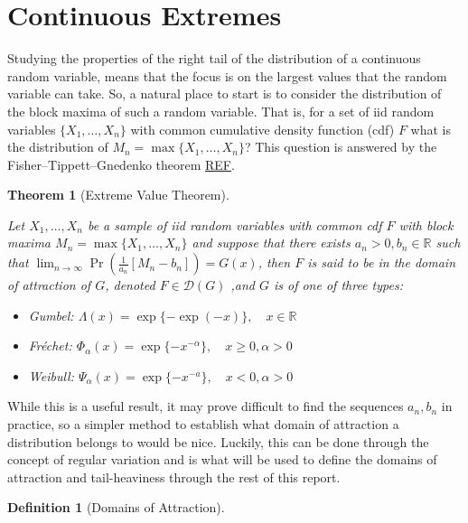 \documentclass[
  10pt,
  a4paper,
]{scrreprt}
\providecommand{\tightlist}{%
  \setlength{\itemsep}{0pt}\setlength{\parskip}{0pt}}\usepackage{longtable,booktabs,array}
\theoremstyle{plain}
\newtheorem{theorem}{Theorem}[section]
\theoremstyle{definition}
\newtheorem{definition}{Definition}[section]
\theoremstyle{remark}
\begin{document}
{\hypertarget{sec-ce}{%
\section{Continuous Extremes}\label{sec-ce}}

Studying the properties of the right tail of the distribution of a
continuous random variable, means that the focus is on the largest
values that the random variable can take. So, a natural place to start
is to consider the distribution of the block maxima of such a random
variable. That is, for a set of iid random variables
\(\{X_1,\ldots,X_n\}\) with common cumulative density function (cdf)
\(F\) what is the distribution of \(M_n = \max\{X_1,\ldots,X_n\}\)? This
question is answered by the Fisher--Tippett--Gnedenko theorem
\href{or\%20more\%20simply\%20the\%20extreme\%20value\%20theorem}{REF}.

\begin{theorem}[Extreme Value
Theorem]\protect\hypertarget{thm-evt}{}\label{thm-evt}

Let \(X_1,\ldots,X_n\) be a sample of iid random variables with common
cdf \(F\) with block maxima \(M_n = \max\{X_1,\ldots,X_n\}\) and suppose
that there exists \(a_n>0, b_n\in\mathbb R\) such that
\(\lim_{n\rightarrow\infty}\Pr(\frac{1}{a_n}[M_n-b_n]) = G(x)\), then
\(F\) is said to be in the domain of attraction of \(G\), denoted
\(F\in\mathcal D(G)\) ,and \(G\) is of one of three types:

\begin{itemize}
\tightlist
\item
  Gumbel: \(\Lambda(x) = \exp\{-\exp(-x)\},\quad x \in \mathbb R\)
\item
  Fréchet:
  \(\Phi_\alpha(x) = \exp\{-x^{-\alpha}\},\quad x\ge 0,\alpha>0\)
\item
  Weibull: \(\Psi_\alpha(x) = \exp\{-x^{-a}\},\quad x<0,\alpha>0\)
\end{itemize}

\end{theorem}

While this is a useful result, it may prove difficult to find the
sequences \(a_n,b_n\) in practice, so a simpler method to establish what
domain of attraction a distribution belongs to would be nice. Luckily,
this can be done through the concept of regular variation and is what
will be used to define the domains of attraction and tail-heaviness
through the rest of this report.

\begin{definition}[Domains of
Attraction]\protect\hypertarget{def-doa}{}\label{def-doa}


\end{definition}}
\end{document}
